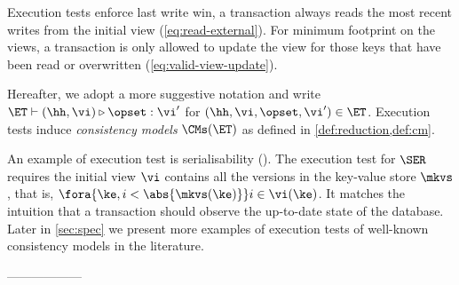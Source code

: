 Execution tests enforce last write win,
\ie a transaction always reads the most recent writes from the initial view (\cref{eq:read-external}).
For minimum footprint on the views, a transaction is only allowed to update the view for those keys that have been read or overwritten (\cref{eq:valid-view-update}).


Hereafter, we adopt a more suggestive notation and write $\ET \vdash (\hh, \vi) \triangleright \opset: \vi'$ 
for $(\hh, \vi, \opset, \vi') \in \ET$.
Execution tests induce \emph{consistency models} \( \CMs(\ET) \) as defined in \cref{def:reduction,def:cm}.

An example of execution test is serialisability (\SER).
The execution test for \( \SER \) requires the initial view  \( \vi \) contains all the versions in the key-value store \( \mkvs \), that is, \( \fora{\ke, i < \abs{\mkvs(\ke)} } i \in \vi(\ke)\).
It matches the intuition that a transaction should observe the up-to-date state of the database.
Later in \cref{sec:spec} we present more examples of execution tests of well-known consistency models in the literature. 


------------------


